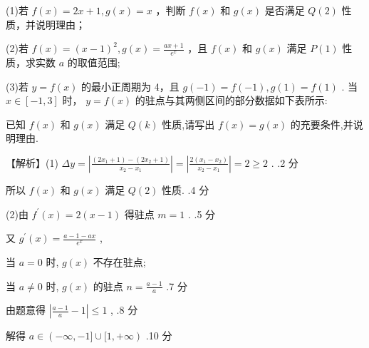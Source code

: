 \documentclass[10pt]{article}
\begin{document}
(1)若 \(f\left( x\right)  = {2x} + 1,g\left( x\right)  = x\) ，判断 \(f\left( x\right)\) 和 \(g\left( x\right)\) 是否满足 \(Q\left( 2\right)\) 性质，并说明理由；

(2)若 \(f\left( x\right)  = {\left( x - 1\right) }^{2},g\left( x\right)  = \frac{{ax} + 1}{{e}^{x}}\) ，且 \(f\left( x\right)\) 和 \(g\left( x\right)\) 满足 \(P\left( 1\right)\) 性质，求实数 \(a\) 的取值范围;

(3)若 \(y = f\left( x\right)\) 的最小正周期为 4，且 \(g\left( {-1}\right)  = f\left( {-1}\right) ,g\left( 1\right)  = f\left( 1\right)\) . 当 \(x \in  \left\lbrack  {-1,3}\right\rbrack\) 时， \(y = f\left( x\right)\) 的驻点与其两侧区间的部分数据如下表所示:

\begin{center}
\end{center}

已知 \(f\left( x\right)\) 和 \(g\left( x\right)\) 满足 \(Q\left( k\right)\) 性质,请写出 \(f\left( x\right)  = g\left( x\right)\) 的充要条件,并说明理由.

【解析】(1) \({\Delta y} = \left| \frac{\left( {2{x}_{1} + 1}\right)  - \left( {2{x}_{2} + 1}\right) }{{x}_{2} - {x}_{1}}\right|  = \left| \frac{2\left( {{x}_{1} - {x}_{2}}\right) }{{x}_{2} - {x}_{1}}\right|  = 2 \geq  2\) . .2 分

所以 \(f\left( x\right)\) 和 \(g\left( x\right)\) 满足 \(Q\left( 2\right)\) 性质. .4 分

(2)由 \({f}^{\prime }\left( x\right)  = 2\left( {x - 1}\right)\) 得驻点 \(m = 1\) . .5 分

又 \({g}^{\prime }\left( x\right)  = \frac{a - 1 - {ax}}{{e}^{x}}\) ,

当 \(a = 0\) 时, \(g\left( x\right)\) 不存在驻点;

当 \(a \neq  0\) 时, \(g\left( x\right)\) 的驻点 \(n = \frac{a - 1}{a}\) .7 分

由题意得 \(\left| {\frac{a - 1}{a} - 1}\right|  \leq  1\) , .8 分

解得 \(a \in  \left( {-\infty , - 1\rbrack \cup \lbrack 1, + \infty }\right)\) .10 分
\end{document}
